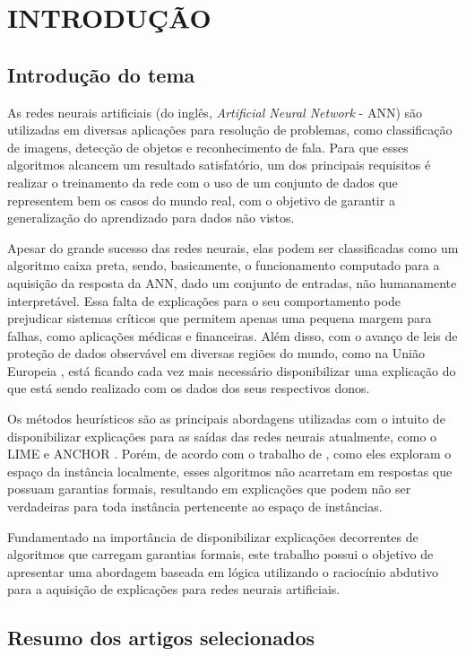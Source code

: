 \chapter{INTRODUÇÃO}
\thispagestyle{empty}

\section{Introdução do tema}
As redes neurais artificiais (do inglês, \textit{Artificial Neural Network} - ANN) são utilizadas em diversas aplicações para resolução de problemas, como classificação de imagens, detecção de objetos e reconhecimento de fala. Para que esses algoritmos alcancem um resultado satisfatório, um dos principais requisitos é realizar o treinamento da rede com o uso de um conjunto de dados que representem bem os casos do mundo real, com o objetivo de garantir a generalização do aprendizado para dados não vistos.

Apesar do grande sucesso das redes neurais, elas podem ser classificadas como um algoritmo caixa preta, sendo, basicamente, o funcionamento computado para a aquisição da resposta da ANN, dado um conjunto de entradas, não humanamente interpretável. Essa falta de explicações para o seu comportamento pode prejudicar sistemas críticos que permitem apenas uma pequena margem para falhas, como aplicações médicas e financeiras. Além disso, com o avanço de leis de proteção de dados observável em diversas regiões do mundo, como na União Europeia \cite{lei_EU}, está ficando cada vez mais necessário disponibilizar uma explicação do que está sendo realizado com os dados dos seus respectivos donos. 

Os métodos heurísticos são as principais abordagens utilizadas com o intuito de disponibilizar explicações para as saídas das redes neurais atualmente, como o LIME \cite{LIME} e ANCHOR \cite{ANCHOR}. Porém, de acordo com o trabalho de , como eles exploram o espaço da instância localmente, esses algoritmos não acarretam em respostas que possuam garantias formais, resultando em explicações que podem não ser verdadeiras para toda instância pertencente ao espaço de instâncias.

Fundamentado na importância de disponibilizar explicações decorrentes de algoritmos que carregam garantias formais, este trabalho possui o objetivo de apresentar uma abordagem baseada em lógica utilizando o raciocínio abdutivo para a aquisição de explicações para redes neurais artificiais.

\section{Resumo dos artigos selecionados}

